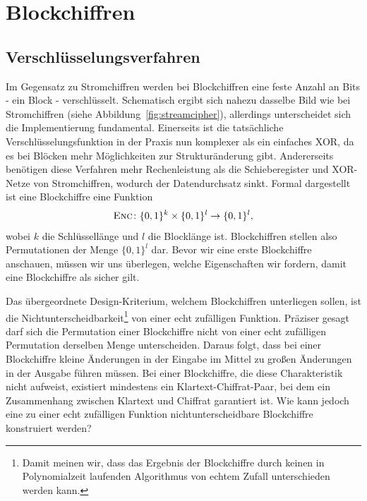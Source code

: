 \section{Blockchiffren}
\label{sec:blockchiffren}
\subsection{Verschlüsselungsverfahren}
Im Gegensatz zu Stromchiffren werden bei Blockchiffren eine feste Anzahl an Bits - ein Block - verschlüsselt. Schematisch ergibt sich nahezu dasselbe Bild wie bei Stromchiffren (siehe Abbildung~\ref{fig:streamcipher}), allerdings unterscheidet sich die Implementierung fundamental. Einerseits ist die tatsächliche Verschlüsselungsfunktion in der Praxis nun komplexer als ein einfaches XOR, da es bei Blöcken mehr Möglichkeiten zur Strukturänderung gibt. Andererseits benötigen diese Verfahren mehr Rechenleistung als die Schieberegister und XOR-Netze von Stromchiffren, wodurch der Datendurchsatz sinkt.
Formal dargestellt ist eine Blockchiffre eine Funktion
\begin{align*}
	\textsc{Enc} \colon \{0, 1\}^k \times \{0, 1\}^l \rightarrow \{0, 1\}^l\text{,}
\end{align*}
wobei \(k\) die Schlüssellänge und \(l\) die Blocklänge ist. Blockchiffren stellen also Permutationen der Menge 
\(\{0, 1\}^l\) dar.
Bevor wir eine erste Blockchiffre anschauen, müssen wir uns überlegen, welche Eigenschaften wir fordern, damit eine Blockchiffre als sicher gilt.

Das übergeordnete Design-Kriterium, welchem Blockchiffren unterliegen sollen, ist die Nichtunterscheidbarkeit\footnote{Damit meinen wir, dass das Ergebnis der Blockchiffre durch keinen in Polynomialzeit laufenden Algorithmus von echtem Zufall unterschieden werden kann.} von einer echt zufälligen Funktion. Präziser gesagt darf sich die Permutation einer Blockchiffre nicht von einer echt zufälligen Permutation derselben Menge unterscheiden. Daraus folgt, dass bei einer Blockchiffre kleine Änderungen in der Eingabe im Mittel zu großen Änderungen in der Ausgabe führen müssen. Bei einer Blockchiffre, die diese Charakteristik nicht aufweist, existiert mindestens ein Klartext-Chiffrat-Paar, bei dem ein Zusammenhang zwischen Klartext und Chiffrat garantiert ist. Wie kann jedoch eine zu einer echt zufälligen Funktion nichtunterscheidbare Blockchiffre konstruiert werden?

